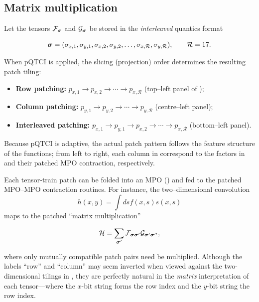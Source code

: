 \subsection{Matrix multiplication}

Let the tensors \(\mathcal{F}_{\boldsymbol{\sigma}}\) and \(\mathcal{G}_{\boldsymbol{\sigma}}\) be stored in the \emph{interleaved} quantics format  

\[
  \boldsymbol{\sigma}
  =( \sigma_{x,1},\sigma_{y,1},\sigma_{x,2},\sigma_{y,2},\dots,
     \sigma_{x,\mathcal R},\sigma_{y,\mathcal R}),
  \qquad
  \mathcal R=17.
\]

When pQTCI is applied, the slicing (projection) order determines the resulting
patch tiling:
\begin{itemize}
  \item \textbf{Row patching:}\;
        \(p_{x,1}\!\to p_{x,2}\!\to\cdots\to p_{x,\mathcal R}\)
        (top–left panel of );
  \item \textbf{Column patching:}\;
        \(p_{y,1}\!\to p_{y,2}\!\to\cdots\to p_{y,\mathcal R}\)
        (centre–left panel);
  \item \textbf{Interleaved patching:}\;
        \(p_{x,1}\!\to p_{y,1}\!\to p_{x,2}\!\to\cdots\to p_{x,\mathcal R}\)
        (bottom–left panel).
\end{itemize}

Because pQTCI is adaptive, the actual patch pattern follows the feature structure of the functions; from left to right, each column in  correspond to the factors in  and their patched MPO contraction, respectively.

Each tensor‐train patch can be folded into an MPO () and fed to the patched MPO–MPO contraction routines.  
For instance, the two–dimensional convolution  
\begin{equation}
    h(x,y) = \int ds f(x,s)s(x,s)
\end{equation}
maps to the patched ``matrix multiplication'' 

\begin{equation}
    \mathcal{H} = \sum_{\boldsymbol{\sigma}'} \mathcal{F}_{\boldsymbol{\sigma}\boldsymbol{\sigma}'}\mathcal{G}_{\boldsymbol{\sigma}'\boldsymbol{\sigma}''},
\end{equation}

where only mutually compatible patch pairs need be multiplied. Although the labels “row”  and “column” may seem inverted when viewed against the two-dimensional tilings in , they are perfectly natural in the \emph{matrix} interpretation of each tensor—where the 
$x$-bit string forms the row index and the 
$y$-bit string the row index.

